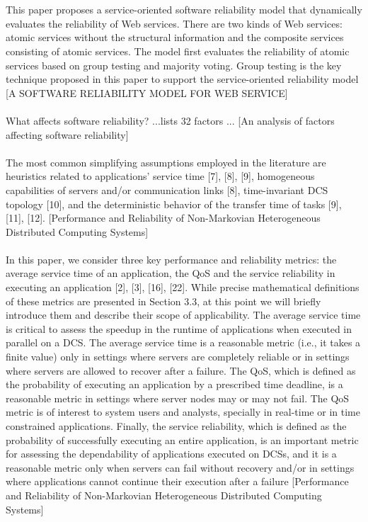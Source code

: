 \documentclass{cslthse-msc}
\begin{document}
\\\\
This paper proposes a service-oriented software reliability model that dynamically evaluates the reliability of Web services. There are two kinds of Web services: atomic services without the structural information and the composite services consisting of atomic services. The model first evaluates the reliability of atomic services based on group testing and majority voting. Group testing is the key technique proposed in this paper to support the service-oriented reliability model [A SOFTWARE RELIABILITY MODEL FOR WEB SERVICE]
\\\\
What affects software reliability? ...lists 32 factors ... [An analysis of factors affecting software reliability]
\\\\
The most common simplifying assumptions employed in the literature are heuristics related to applications’ service time [7], [8], [9], homogeneous capabilities of servers and/or communication links [8], time-invariant DCS topology [10], and the deterministic behavior of the transfer time of tasks [9], [11], [12]. [Performance and Reliability of Non-Markovian Heterogeneous Distributed Computing Systems]
\\\\
In this paper, we consider three key performance and reliability metrics: the average service time of an application, the QoS and the service reliability in executing an application [2], [3], [16], [22]. While precise mathematical definitions of these metrics are presented in Section 3.3, at this point we will briefly introduce them and describe their scope of applicability. The average service time is critical to assess the speedup in the runtime of applications when executed in parallel on a DCS. The average service time is a reasonable metric (i.e., it takes a finite value) only in settings where servers are completely reliable or in settings where servers are allowed to recover after a failure. The QoS, which is defined as the probability of executing an application by a prescribed time deadline, is a reasonable metric in settings where server nodes may or may not fail. The QoS metric is of interest to system users and analysts, specially in real-time or in time constrained applications. Finally, the service reliability, which is defined as the probability of successfully executing an entire application, is an important metric for assessing the dependability of applications executed on DCSs, and it is a reasonable metric only when servers can fail without recovery and/or in settings where applications cannot continue their execution after a failure [Performance and Reliability of Non-Markovian Heterogeneous Distributed Computing Systems]
\end{document}

